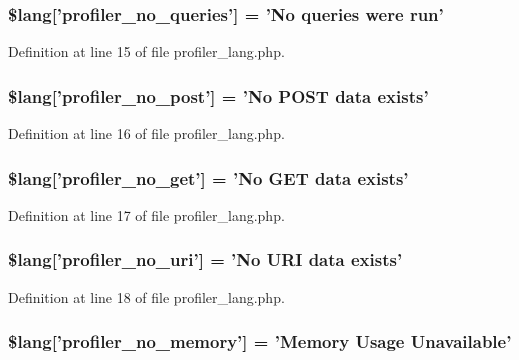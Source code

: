 \subsubsection[{\$lang}]{\setlength{\rightskip}{0pt plus 5cm}\$lang['profiler\-\_\-no\-\_\-queries'] = 'No queries were run'}\label{profiler__lang_8php_a783abf2a3410bbc9c32e4b7bb774724b}


Definition at line 15 of file profiler\-\_\-lang.\-php.

\subsubsection[{\$lang}]{\setlength{\rightskip}{0pt plus 5cm}\$lang['profiler\-\_\-no\-\_\-post'] = 'No P\-O\-S\-T data exists'}\label{profiler__lang_8php_a06e8171d08be812398060c126233a237}


Definition at line 16 of file profiler\-\_\-lang.\-php.

\subsubsection[{\$lang}]{\setlength{\rightskip}{0pt plus 5cm}\$lang['profiler\-\_\-no\-\_\-get'] = 'No G\-E\-T data exists'}\label{profiler__lang_8php_a8ecf037acbeb4a7b202b8238c8d1a328}


Definition at line 17 of file profiler\-\_\-lang.\-php.

\subsubsection[{\$lang}]{\setlength{\rightskip}{0pt plus 5cm}\$lang['profiler\-\_\-no\-\_\-uri'] = 'No U\-R\-I data exists'}\label{profiler__lang_8php_ac7d16f2f99b12aeaa609be6bcb89759e}


Definition at line 18 of file profiler\-\_\-lang.\-php.

\subsubsection[{\$lang}]{\setlength{\rightskip}{0pt plus 5cm}\$lang['profiler\-\_\-no\-\_\-memory'] = 'Memory Usage Unavailable'}\label{profiler__lang_8php_a32345afdaa3f160ba1d21d03223313ad}



